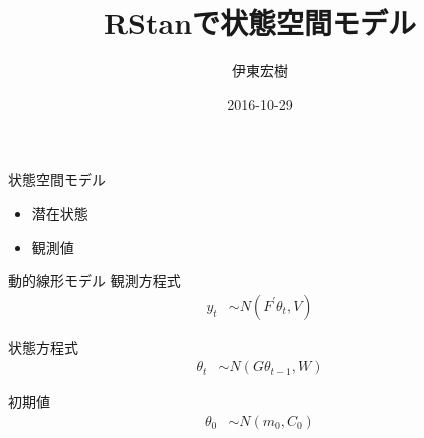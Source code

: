 \documentclass[dvipdfmx,12pt]{beamer}
\begin{document}
\title{RStanで状態空間モデル}
\author{伊東宏樹}
\date{2016-10-29}
\maketitle

\begin{frame}{状態空間モデル}
\begin{itemize}
\item 潜在状態
\item 観測値
\end{itemize}

\end{frame}

\begin{frame}{動的線形モデル}
  観測方程式
  \begin{align*}
    y_t &\sim N(F^{\prime} \theta_t, V)
  \end{align*}

  状態方程式
  \begin{align*}
    \theta_t &\sim N(G \theta_{t-1}, W)
  \end{align*}

  初期値
  \begin{align*}
    \theta_0 &\sim N(m_0, C_0)
  \end{align*}

\end{frame}
\end{document}
